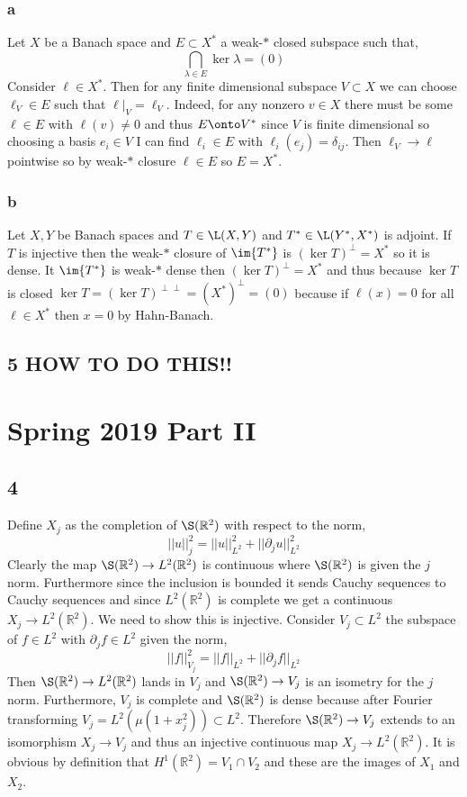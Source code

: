 \documentclass[12pt]{article}
\newcommand{\R}{\mathbb{R}}
\begin{document}
\subsubsection{a}

Let $X$ be a Banach space and $E \subset X^*$ a weak-$*$ closed subspace such that,
\[ \bigcap_{\lambda \in E} \ker{\lambda} = (0) \]
Consider $\ell \in X^*$. Then for any finite dimensional subspace $V \subset X$ we can choose $\ell_V \in E$ such that $\ell|_V = \ell_V$. Indeed, for any nonzero $v \in X$ there must be some $\ell \in E$ with $\ell(v) \neq 0$ and thus $E \onto V^*$ since $V$ is finite dimensional so choosing a basis $e_i \in V$ I can find $\ell_i \in E$ with $\ell_i(e_j) = \delta_{ij}$. Then $\ell_V \to \ell$ pointwise so by weak-$*$ closure $\ell \in E$ so $E = X^*$.

\subsubsection{b}

Let $X, Y$ be Banach spaces and $T \in \L(X, Y)$ and $T^* \in \L(Y^*, X^*)$ is adjoint. If $T$ is injective then the weak-$*$ closure of $\im{T^*}$ is $(\ker{T})^\perp = X^*$ so it is dense. It $\im{T^*}$ is weak-$*$ dense then $(\ker{T})^\perp = X^*$ and thus because $\ker{T}$ is closed $\ker{T} = (\ker{T})^{\perp \perp} = (X^*)^\perp = (0)$ because if $\ell(x) = 0$ for all $\ell \in X^*$ then $x = 0$ by Hahn-Banach. 


\subsection{5 HOW TO DO THIS!!}

\section{Spring 2019 Part II}

\subsection{4}

Define $X_j$ as the completion of $\S(\R^2)$ with respect to the norm,
\[ || u ||_j^2 = || u ||_{L^2}^2  +|| \partial_j u ||^2_{L^2} \]
Clearly the map $\S(\R^2) \to L^2(\R^2)$ is continuous where $\S(\R^2)$ is given the $j$ norm. Furthermore since the inclusion is bounded it sends Cauchy sequences to Cauchy sequences and since $L^2(\R^2)$ is complete we get a continuous $X_j \to L^2(\R^2)$. We need to show this is injective. Consider $V_j \subset L^2$ the subspace of $f \in L^2$ with $\partial_j f \in L^2$ given the norm,
\[ || f ||_{V_j}^2 = || f ||_{L^2} + || \partial_j f ||_{L^2} \]
Then $\S(\R^2) \to L^2(\R^2)$ lands in $V_j$ and $\S(\R^2) \to V_j$ is an isometry for the $j$ norm. Furthermore, $V_j$ is complete and $\S(\R^2)$ is dense because after Fourier transforming $V_j = L^2(\mu (1 + x_j^2)) \subset L^2$. Therefore $\S(\R^2) \to V_j$ extends to an isomorphism $X_j \to V_j$ and thus an injective continuous map $X_j \to L^2(\R^2)$. It is obvious by definition that $H^1(\R^2) = V_1 \cap V_2$ and these are the images of $X_1$ and $X_2$.
\end{document}
